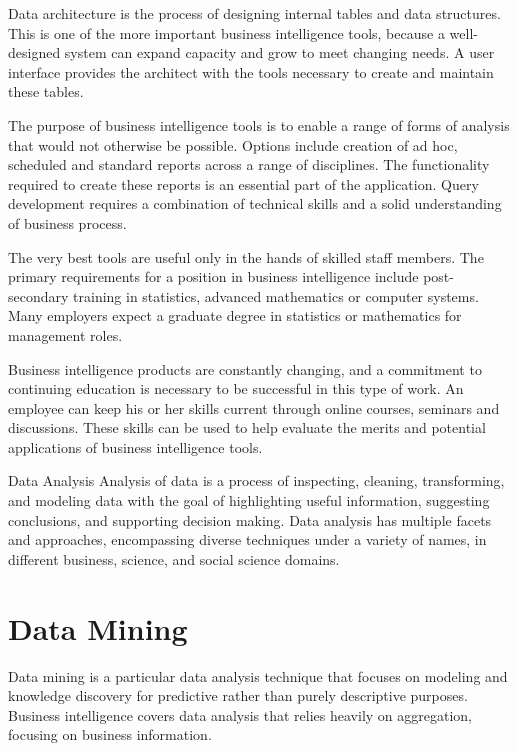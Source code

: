 Data architecture is the process of designing internal tables and data structures. This is one of the more important business intelligence tools, because a well-designed system can expand capacity and grow to meet changing needs. A user interface provides the architect with the tools necessary to create and maintain these tables.

The purpose of business intelligence tools is to enable a range of forms of analysis that would not otherwise be possible. Options include creation of ad hoc, scheduled and standard reports across a range of disciplines. The functionality required to create these reports is an essential part of the application. Query development requires a combination of technical skills and a solid understanding of business process.

The very best tools are useful only in the hands of skilled staff members. The primary requirements for a position in business intelligence include post-secondary training in statistics, advanced mathematics or computer systems. Many employers expect a graduate degree in statistics or mathematics for management roles.

Business intelligence products are constantly changing, and a commitment to continuing education is necessary to be successful in this type of work. An employee can keep his or her skills current through online courses, seminars and discussions. These skills can be used to help evaluate the merits and potential applications of business intelligence tools.






Data Analysis
Analysis of data is a process of inspecting, cleaning, transforming, and modeling data with the goal of highlighting useful information, suggesting conclusions, and supporting decision making. Data analysis has multiple facets and approaches, encompassing diverse techniques under a variety of names, in different business, science, and social science domains.

\section{Data Mining}

Data mining is a particular data analysis technique that focuses on modeling and knowledge discovery for predictive rather than purely descriptive purposes. Business intelligence covers data analysis that relies heavily on aggregation, focusing on business information. 

